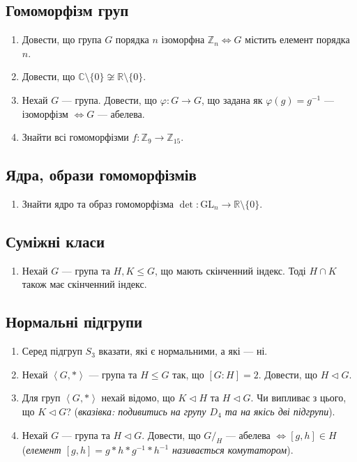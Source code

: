 \documentclass{math_library}
\begin{document}
\subsection{Гомоморфізм груп}
\begin{enumerate}[wide=0pt,label=\thesubsection.\arabic*]
\item Довести, що група $G$ порядка $n$ ізоморфна $\mathbb{Z}_n \iff G$ містить елемент порядка $n$. 

\item Довести, що $\mathbb{C} \setminus \{0\} \not\cong \mathbb{R} \setminus \{0\}$.

\item Нехай $G$ --- група. Довести, що $\varphi \colon G \to G$, що задана як $\varphi(g) =g^{-1}$ --- ізоморфізм $\iff G$ --- абелева.

\item Знайти всі гомоморфізми $f \colon \mathbb{Z}_9 \to \mathbb{Z}_{15}$.
\end{enumerate}

\subsection{Ядра, образи гомоморфізмів}
\begin{enumerate}[wide=0pt,label=\thesubsection.\arabic*]
\item Знайти ядро та образ гомоморфізма $\det \colon \textrm{GL}_n \to \mathbb{R} \setminus \{0\}$.
\end{enumerate}

\subsection{Суміжні класи}
\begin{enumerate}[wide=0pt,label=\thesubsection.\arabic*]
\item Нехай $G$ --- група та $H,K \leq G$, що мають скінченний індекс. Тоді $H \cap K$ також має скінченний індекс.
\end{enumerate}

\subsection{Нормальні підгрупи}
\begin{enumerate}[wide=0pt,label=\thesubsection.\arabic*]
\item Серед підгруп $S_3$ вказати, які є нормальними, а які --- ні.

\item Нехай $\left<G,*\right>$ --- група та $H \leq G$ так, що $[G:H] = 2$. Довести, що $H \triangleleft G$.

\item Для груп $\left< G, * \right>$ нехай відомо, що $K \triangleleft H$ та $H \triangleleft G$. Чи випливає з цього, що $K \triangleleft G$? (\textit{вказівка: подивитись на групу $D_4$ та на якісь дві підгрупи}).

\item Нехай $G$ --- група та $H \triangleleft G$. Довести, що $G/_H$ --- абелева $\iff [g,h] \in H$ (\textit{елемент $[g,h] = g*h*g^{-1}*h^{-1}$ називається комутатором}).
\end{enumerate}
\end{document}
